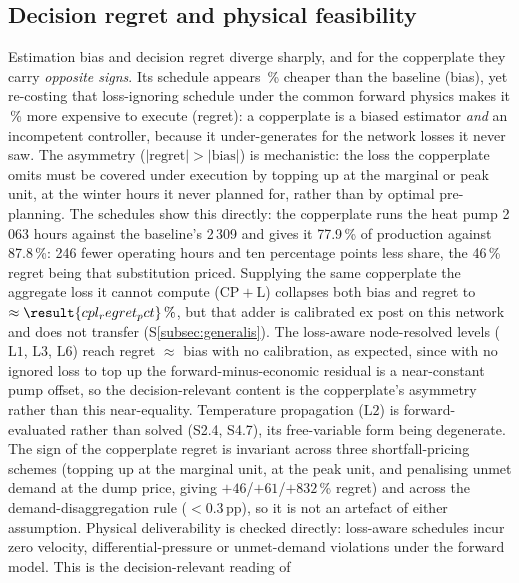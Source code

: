 \documentclass[a4paper,fleqn]{cas-sc}
\newcommand{\CPL}{\ensuremath{\mathrm{CP{+}L}}} %
\newcommand{\Lone}{\ensuremath{\mathrm{L1}}}    %
\newcommand{\Ltwo}{\ensuremath{\mathrm{L2}}}    %
\newcommand{\Lthree}{\ensuremath{\mathrm{L3}}}  %
\newcommand{\Lsix}{\ensuremath{\mathrm{L6}}}    %
\begin{document}
\subsection{Decision regret and physical feasibility}
Estimation bias and decision regret diverge sharply, and for the copperplate they
carry \emph{opposite signs}. Its schedule appears \,\% cheaper
than the baseline (bias), yet re-costing that loss-ignoring schedule under the common
forward physics makes it \,\% more expensive to execute
(regret): a copperplate is a biased estimator \emph{and} an incompetent controller,
because it under-generates for the network losses it never saw. The asymmetry
($|\text{regret}|>|\text{bias}|$) is mechanistic: the loss the copperplate omits must
be covered under execution by topping up at the marginal or peak unit, at the winter
hours it never planned for, rather than by optimal pre-planning. The schedules show this directly: the copperplate runs the heat pump 2\,063 hours against the baseline's 2\,309 and gives it 77.9\,\% of production against 87.8\,\%: 246 fewer operating hours and ten percentage points less share, the 46\,\% regret being that substitution priced. Supplying the same
copperplate the aggregate loss it cannot compute (\CPL) collapses both bias and regret
to $\approx\result{cpl_regret_pct}\,\%$, but that adder is calibrated ex post on this
network and does not transfer (S\ref{subsec:generalis}). The loss-aware node-resolved levels
(\Lone, \Lthree, \Lsix) reach regret $\approx$ bias with no calibration, as expected, since with
no ignored loss to top up the forward-minus-economic residual is a near-constant pump offset, so
the decision-relevant content is the copperplate's asymmetry rather than this near-equality.
Temperature propagation (\Ltwo) is forward-evaluated rather than solved (S2.4, S4.7), its
free-variable form being degenerate. The sign of the
copperplate regret is invariant across three shortfall-pricing schemes (topping up at
the marginal unit, at the peak unit, and penalising unmet demand at the dump price, giving
$+46$/$+61$/$+832$\,\% regret) and across the demand-disaggregation rule
($<0.3$\,pp), so it is not an artefact of either assumption. Physical deliverability is
checked directly: loss-aware schedules incur zero velocity, differential-pressure or
unmet-demand violations under the forward model. This is the decision-relevant reading of
\end{document}
